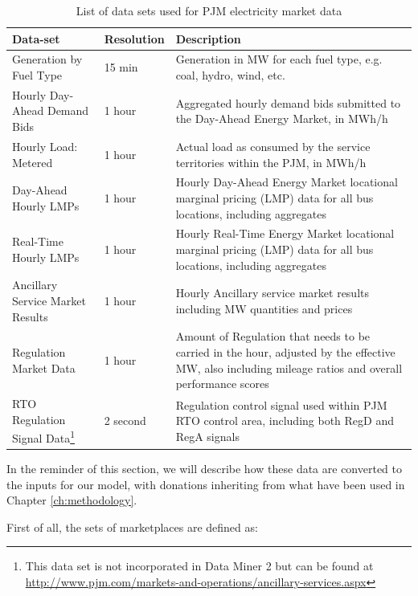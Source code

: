 \begin{table}
	\footnotesize
	\centering
	\begin{tabular}{L{5cm} L{2cm} L{6cm} }
		\hline
		\textbf{Data-set} & \textbf{Resolution} & \textbf{Description} \\
		\hline
		\hline
		Generation by Fuel Type & 15 min & Generation in MW for each fuel type, e.g. coal, hydro, wind, etc. \\
		\hline
		Hourly Day-Ahead Demand Bids & 1 hour & Aggregated hourly demand bids submitted to the Day-Ahead Energy Market, in MWh/h \\
		\hline
		Hourly Load: Metered & 1 hour & Actual load as consumed by the service territories within the PJM, in MWh/h \\
		\hline
		Day-Ahead Hourly LMPs & 1 hour & Hourly Day-Ahead Energy Market locational marginal pricing (LMP) data for all bus locations, including aggregates \\
		\hline
		Real-Time Hourly LMPs & 1 hour & Hourly Real-Time Energy Market locational marginal pricing (LMP) data for all bus locations, including aggregates\\
		\hline
		Ancillary Service Market Results & 1 hour & Hourly Ancillary service market results including MW quantities and prices\\
		\hline
		Regulation Market Data & 1 hour & Amount of Regulation that needs to be carried in the hour, adjusted by the effective MW, also including mileage ratios and overall performance scores \\
		\hline
		RTO Regulation Signal Data\footnote{This data set is not incorporated in Data Miner 2 but can be found at \url{http://www.pjm.com/markets-and-operations/ancillary-services.aspx}} & 2 second& Regulation control signal used within PJM RTO control area, including both RegD and RegA signals\\
		\hline
	\end{tabular}
	\caption{List of data sets used for PJM electricity market data}\label{tab:pjm-data}
\end{table}

In the reminder of this section, we will describe how these data are converted to the inputs for our model, with donations inheriting from what have been used in Chapter \ref{ch:methodology}.

First of all, the sets of marketplaces are defined as:

